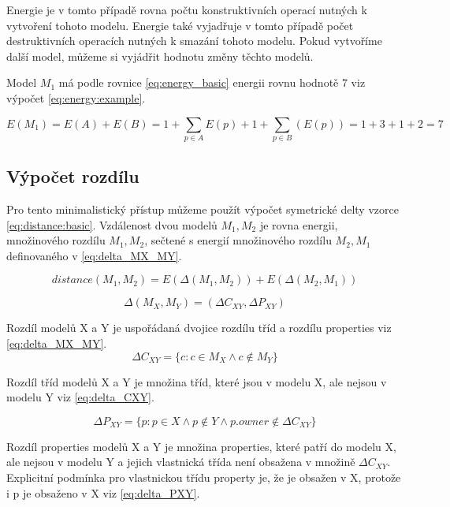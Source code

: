 \documentclass[11pt,twoside,a4paper]{book}
\begin{document}
Energie je v tomto případě rovna počtu konstruktivních operací nutných k
vytvoření tohoto modelu. Energie také vyjadřuje v tomto případě počet
destruktivních operacích nutných k smazání tohoto modelu. Pokud vytvoříme
další model, můžeme si vyjádřit hodnotu změny těchto modelů. 

Model $M_1$ má podle
rovnice \eqref{eq:energy_basic} energii rovnu hodnotě 7 viz výpočet
\ref{eq:energy:example}.

\begin{equation} 
 E(M_1)= E(A) + E(B) = 1 + \sum_{p \in A}E(p) + 1 + \sum_{p
\in B}(E(p)) = 1 + 3 + 1 + 2 = 7 \label{eq:energy:example} \end{equation}


\subsection{Výpočet rozdílu}
Pro tento minimalistický přístup můžeme použít výpočet symetrické delty
vzorce \eqref{eq:distance:basic}. Vzdálenost dvou modelů $M_1, M_2$ je
rovna energii, množinového rozdílu $M_1,M_2$, sečtené s energií množinového
rozdílu $M_2, M_1$ definovaného v \eqref{eq:delta_MX_MY}.


\begin{equation}distance(M_1,M_2) = E(\Delta(M_1,M_2)) + E(\Delta(M_2,
M_1))\label{eq:distance:basic}\end{equation} 


\begin{equation}\Delta(M_X,M_Y) = (\Delta {C_{XY}}, \Delta{P_{XY}})
\label{eq:delta_MX_MY}\end{equation}

Rozdíl modelů X a Y je uspořádaná dvojice rozdílu tříd a rozdílu properties viz
\eqref{eq:delta_MX_MY}.
\begin{equation}\Delta {C_{XY}} = \{c: c \in M_X \wedge c \notin
M_Y\}\label{eq:delta_CXY}\end{equation} 

Rozdíl tříd modelů X a Y je množina tříd, které jsou v modelu X, ale nejsou v
modelu Y viz \eqref{eq:delta_CXY}.

 \begin{equation}\Delta{P_{XY}} = \{p: p \in X \wedge p \notin Y \wedge p.owner
\notin \Delta {C_{XY}}\}\label{eq:delta_PXY}\end{equation}

Rozdíl properties modelů X a Y je množina properties, které patří do modelu X,
ale nejsou v modelu Y a jejich vlastnická třída není obsažena v množině  $\Delta
{C_{XY}}$. Explicitní podmínka pro vlastnickou třídu property je, že je obsažen
v X, protože i p je obsaženo v X viz \eqref{eq:delta_PXY}.
\end{document}
